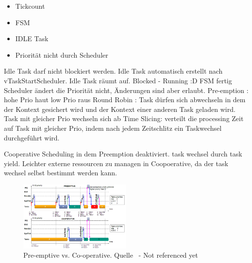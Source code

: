 \begin{itemize}
	\item Tickcount
	\item FSM
	\item IDLE Task
	\item Priorität nicht durch Scheduler
\end{itemize}
                   
 

Idle Task darf nicht blockiert werden. Idle Task automatisch erstellt nach vTaskStartScheduler. Idle Task räumt auf.  
Blocked - Running :D FSM fertig
Scheduler ändert die Priorität nicht, Änderungen sind aber erlaubt.
Pre-emption : hohe Prio haut low Prio raus
Round Robin : Task dürfen sich abwechseln in dem der Kontext gesichert wird und der Kontext einer anderen Task geladen wird.
Task mit gleicher Prio wechseln sich ab
Time Slicing: verteilt die processing Zeit auf Task mit gleicher Prio, indem nach jedem Zeitschlitz ein Taskwechsel durchgeführt wird.

Cooperative Scheduling in dem Preemption deaktiviert. task wechsel durch task yield.
Leichter externe ressourcen zu managen in Coopoerative, da der task wechsel selbst bestimmt werden kann. 

\begin{figure}[ht!]
	\centering
		\includegraphics[width=0.5\textwidth]{Pictures/EMCUIT/PreemptiveCooperative.png}
	\caption{Pre-emptive vs. Co-operative. Quelle~\protect{} - Not referenced yet}
	\label{fig:PreVSCo}
\end{figure}

